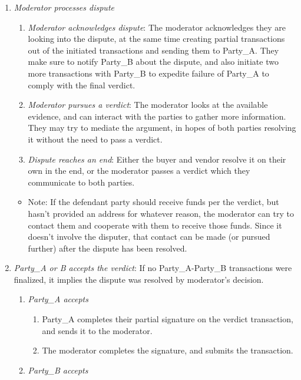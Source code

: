 \begin{enumerate}
\begin{enumerate}
        \item {\em Moderator processes dispute}
        \begin{enumerate}
            \item {\em Moderator acknowledges dispute}: The moderator acknowledges they are looking into the dispute, at the same time creating partial transactions out of the initiated transactions and sending them to Party\_A. They make sure to notify Party\_B about the dispute, and also initiate two more transactions with Party\_B to expedite failure of Party\_A to comply with the final verdict.
            \item {\em Moderator pursues a verdict}: The moderator looks at the available evidence, and can interact with the parties to gather more information. They may try to mediate the argument, in hopes of both parties resolving it without the need to pass a verdict.
            \item {\em Dispute reaches an end}: Either the buyer and vendor resolve it on their own in the end, or the moderator passes a verdict which they communicate to both parties.
        \end{enumerate}{}
        \begin{itemize}
            \item Note: If the defendant party should receive funds per the verdict, but hasn't provided an address for whatever reason, the moderator can try to contact them and cooperate with them to receive those funds. Since it doesn't involve the disputer, that contact can be made (or pursued further) after the dispute has been resolved.
        \end{itemize}{}
        \item {\em Party\_A or B accepts the verdict}: If no Party\_A-Party\_B transactions were finalized, it implies the dispute was resolved by moderator's decision.
        \begin{enumerate}
            \item {\em Party\_A accepts}
            \begin{enumerate}
                \item Party\_A completes their partial signature on the verdict transaction, and sends it to the moderator.
                \item The moderator completes the signature, and submits the transaction.
            \end{enumerate}{}
            \item {\em Party\_B accepts}
            \begin{enumerate}

\end{enumerate}
\end{enumerate}
\end{enumerate}
\end{enumerate}
